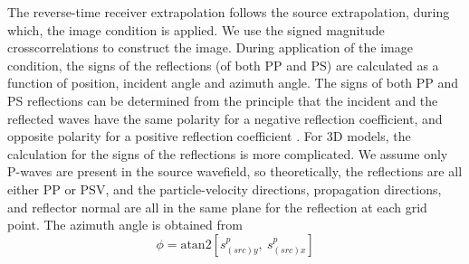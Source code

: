\documentclass[manuscript,ulem,graphix,revised]{geophysics}
\begin{document}


The reverse-time receiver extrapolation follows the source extrapolation, during which, the image condition is applied. We use the signed magnitude crosscorrelations to construct the image. 
During application of the image condition, the signs of the reflections (of both PP and PS) are calculated as a function of position, incident angle and azimuth angle.
The signs of both PP and PS reflections can be determined from the principle that the incident and the reflected waves have the same polarity for a negative reflection coefficient, and opposite polarity for a positive reflection coefficient \citep{aki80}. For 3D models, the calculation for the signs of the reflections is more complicated. 
We assume only P-waves are present in the source wavefield, so theoretically, the reflections are all either PP or PSV, and the particle-velocity directions, propagation directions, and reflector normal are all in the same plane for the reflection at each grid point. The azimuth angle is obtained from 
\begin{equation}
\phi=\mathrm{atan2}[s^{p}_{(src)y},\ s^{p}_{(src)x}]
\label{eqn:azm_agl}
\end{equation}
\end{document}
